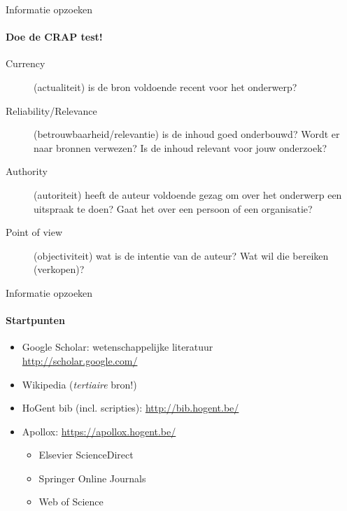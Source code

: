 \begin{frame}{Informatie opzoeken}
  \framesubtitle{Doe de CRAP test!}
  
\begin{description}
  \item[Currency] (actualiteit) is de bron voldoende recent voor het onderwerp?
  \item[Reliability/Relevance] (betrouwbaarheid/relevantie) is de inhoud goed onderbouwd? Wordt er naar bronnen verwezen? Is de inhoud relevant voor jouw onderzoek?
  \item[Authority] (autoriteit) heeft de auteur voldoende gezag om over het onderwerp een uitspraak te doen? Gaat het over een persoon of een organisatie?
  \item[Point of view] (objectiviteit) wat is de intentie van de auteur? Wat wil die bereiken (verkopen)?
\end{description}
\end{frame}

\begin{frame}{Informatie opzoeken}
  \framesubtitle{Startpunten}
  
  \begin{itemize}
    \item Google Scholar: wetenschappelijke literatuur\\\url{http://scholar.google.com/}
    \item Wikipedia (\emph{tertiaire} bron!)
    \item HoGent bib (incl. scripties): \url{http://bib.hogent.be/}
    \item Apollox: \url{https://apollox.hogent.be/}
    \begin{itemize}
      \item Elsevier ScienceDirect
      \item Springer Online Journals
      \item Web of Science
    \end{itemize}
  \end{itemize}

\end{frame}


